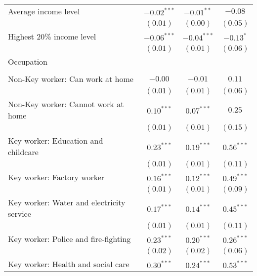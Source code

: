 \begin{table}
\begin{center}
\begin{scriptsize}
\begin{tabular}{l c c c}
\quad Average income level                      & $-0.02^{***}$ & $-0.01^{**}$  & $-0.08$      \\
                                                & $(0.01)$      & $(0.00)$      & $(0.05)$     \\
\quad Highest 20\% income level                 & $-0.06^{***}$ & $-0.04^{***}$ & $-0.13^{*}$  \\
                                                & $(0.01)$      & $(0.01)$      & $(0.06)$     \\
Occupation                                      &               &               &              \\
                                                &               &               &              \\
\quad Non-Key worker: Can work at home          & $-0.00$       & $-0.01$       & $0.11$       \\
                                                & $(0.01)$      & $(0.01)$      & $(0.06)$     \\
\quad Non-Key worker: Cannot work at home       & $0.10^{***}$  & $0.07^{***}$  & $0.25$       \\
                                                & $(0.01)$      & $(0.01)$      & $(0.15)$     \\
\quad Key worker: Education and childcare       & $0.23^{***}$  & $0.19^{***}$  & $0.56^{***}$ \\
                                                & $(0.01)$      & $(0.01)$      & $(0.11)$     \\
\quad Key worker: Factory worker                & $0.16^{***}$  & $0.12^{***}$  & $0.49^{***}$ \\
                                                & $(0.01)$      & $(0.01)$      & $(0.09)$     \\
\quad Key worker: Water and electricity service & $0.17^{***}$  & $0.14^{***}$  & $0.45^{***}$ \\
                                                & $(0.01)$      & $(0.01)$      & $(0.11)$     \\
\quad Key worker: Police and fire-fighting      & $0.23^{***}$  & $0.20^{***}$  & $0.26^{***}$ \\
                                                & $(0.02)$      & $(0.02)$      & $(0.06)$     \\
\quad Key worker: Health and social care        & $0.30^{***}$  & $0.24^{***}$  & $0.53^{***}$ \\

\end{tabular}
\end{scriptsize}
\end{center}
\end{table}
